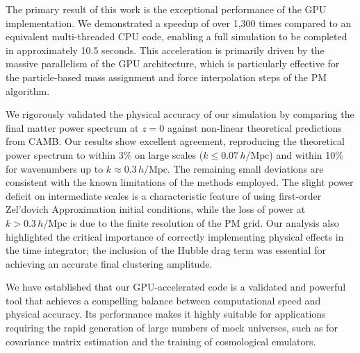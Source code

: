 \documentclass[]{article}
\begin{document}
The primary result of this work is the exceptional performance of the GPU implementation. We demonstrated a speedup of over 1,300 times compared to an equivalent multi-threaded CPU code, enabling a full simulation to be completed in approximately 10.5 seconds. This acceleration is primarily driven by the massive parallelism of the GPU architecture, which is particularly effective for the particle-based mass assignment and force interpolation steps of the PM algorithm.

We rigorously validated the physical accuracy of our simulation by comparing the final matter power spectrum at $z=0$ against non-linear theoretical predictions from CAMB. Our results show excellent agreement, reproducing the theoretical power spectrum to within 3\% on large scales ($k \le 0.07 \, h/\text{Mpc}$) and within 10\% for wavenumbers up to $k \approx 0.3 \, h/\text{Mpc}$. The remaining small deviations are consistent with the known limitations of the methods employed. The slight power deficit on intermediate scales is a characteristic feature of using first-order Zel'dovich Approximation initial conditions, while the loss of power at $k > 0.3 \, h/\text{Mpc}$ is due to the finite resolution of the PM grid. Our analysis also highlighted the critical importance of correctly implementing physical effects in the time integrator; the inclusion of the Hubble drag term was essential for achieving an accurate final clustering amplitude.

We have established that our GPU-accelerated code is a validated and powerful tool that achieves a compelling balance between computational speed and physical accuracy. Its performance makes it highly suitable for applications requiring the rapid generation of large numbers of mock universes, such as for covariance matrix estimation and the training of cosmological emulators.


{}

\end{document}
